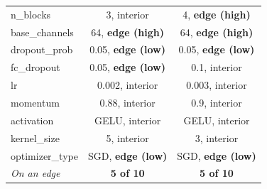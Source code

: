 \begin{table}[t]
{\begin{tabular}{llcccc}
\multicolumn{2}{l}{\quad n\_blocks} & \multicolumn{2}{c}{3, interior} & \multicolumn{2}{c}{4, \textbf{edge (high)}} \\
\multicolumn{2}{l}{\quad base\_channels} & \multicolumn{2}{c}{64, \textbf{edge (high)}} & \multicolumn{2}{c}{64, \textbf{edge (high)}} \\
\multicolumn{2}{l}{\quad dropout\_prob} & \multicolumn{2}{c}{0.05, \textbf{edge (low)}} & \multicolumn{2}{c}{0.05, \textbf{edge (low)}} \\
\multicolumn{2}{l}{\quad fc\_dropout} & \multicolumn{2}{c}{0.05, \textbf{edge (low)}} & \multicolumn{2}{c}{0.1, interior} \\
\multicolumn{2}{l}{\quad lr} & \multicolumn{2}{c}{0.002, interior} & \multicolumn{2}{c}{0.003, interior} \\
\multicolumn{2}{l}{\quad momentum} & \multicolumn{2}{c}{0.88, interior} & \multicolumn{2}{c}{0.9, interior} \\
\multicolumn{2}{l}{\quad activation} & \multicolumn{2}{c}{GELU, interior} & \multicolumn{2}{c}{GELU, interior} \\
\multicolumn{2}{l}{\quad kernel\_size} & \multicolumn{2}{c}{5, interior} & \multicolumn{2}{c}{3, interior} \\
\multicolumn{2}{l}{\quad optimizer\_type} & \multicolumn{2}{c}{SGD, \textbf{edge (low)}} & \multicolumn{2}{c}{SGD, \textbf{edge (low)}} \\
\multicolumn{2}{l}{\quad \emph{On an edge}} & \multicolumn{2}{c}{\textbf{5 of 10}} & \multicolumn{2}{c}{\textbf{5 of 10}} \\
\bottomrule
\end{tabular}}
\end{table}
